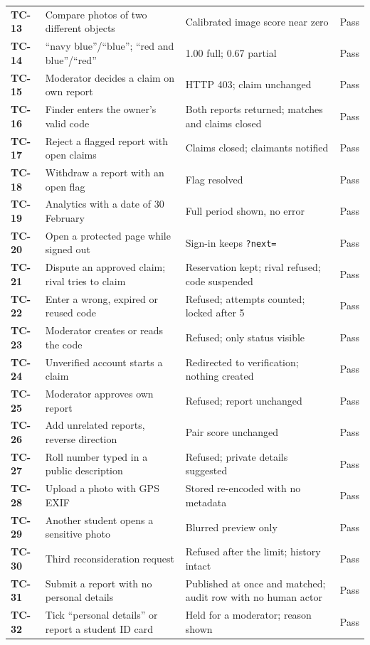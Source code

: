 \documentclass[12pt,a4paper,oneside]{report}
\newcommand{\code}[1]{\texttt{#1}}
\begin{document}
\begin{longtable}{>{\bfseries}P{14mm}P{56mm}P{60mm}P{12mm}}
TC-13 & Compare photos of two different objects & Calibrated image score near zero & Pass\\
TC-14 & ``navy blue''/``blue''; ``red and blue''/``red'' & 1.00 full; 0.67 partial & Pass\\
TC-15 & Moderator decides a claim on own report & HTTP 403; claim unchanged & Pass\\
TC-16 & Finder enters the owner's valid code & Both reports returned; matches and claims closed & Pass\\
TC-17 & Reject a flagged report with open claims & Claims closed; claimants notified & Pass\\
TC-18 & Withdraw a report with an open flag & Flag resolved & Pass\\
TC-19 & Analytics with a date of 30 February & Full period shown, no error & Pass\\
TC-20 & Open a protected page while signed out & Sign-in keeps \code{?next=} & Pass\\
TC-21 & Dispute an approved claim; rival tries to claim & Reservation kept; rival refused; code suspended & Pass\\
TC-22 & Enter a wrong, expired or reused code & Refused; attempts counted; locked after 5 & Pass\\
TC-23 & Moderator creates or reads the code & Refused; only status visible & Pass\\
TC-24 & Unverified account starts a claim & Redirected to verification; nothing created & Pass\\
TC-25 & Moderator approves own report & Refused; report unchanged & Pass\\
TC-26 & Add unrelated reports, reverse direction & Pair score unchanged & Pass\\
TC-27 & Roll number typed in a public description & Refused; private details suggested & Pass\\
TC-28 & Upload a photo with GPS EXIF & Stored re-encoded with no metadata & Pass\\
TC-29 & Another student opens a sensitive photo & Blurred preview only & Pass\\
TC-30 & Third reconsideration request & Refused after the limit; history intact & Pass\\
TC-31 & Submit a report with no personal details & Published at once and matched; audit row with no human actor & Pass\\
TC-32 & Tick ``personal details'' or report a student ID card & Held for a moderator; reason shown & Pass\\
\bottomrule
\end{longtable}
\end{document}
